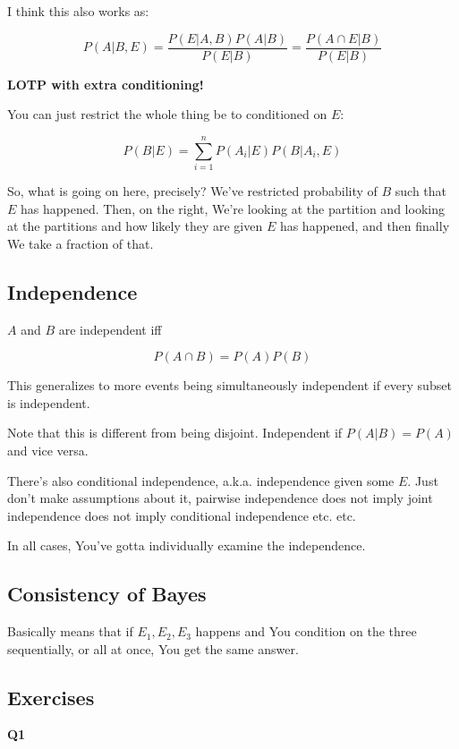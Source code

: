 \documentclass{article}
\begin{document}
			I think this also works as:
				
			$$P(A\vert B, E) = \frac{P(E\vert A, B)P(A\vert B)}{P(E\vert B)} = \frac{P(A\cap E\vert B)}{P(E\vert B)}$$
			
		\textbf{LOTP with extra conditioning!}
		
			You can just restrict the whole thing be to conditioned on $E$:
		
				
			$$P(B\vert E) = \sum^n_{i=1} P(A_i\vert E)P(B\vert A_i, E)$$	
			
			So, what is going on here, precisely? We've restricted probability of $B$ such that $E$ has happened. Then, on the right, We're looking at the partition and looking at the partitions and how likely they are given $E$ has happened, and then finally We take a fraction of that.
	
	\subsection{Independence}
	
		$A$ and $B$ are independent iff
		
		$$P(A \cap B) = P(A)P(B)$$
		
		This generalizes to more events being simultaneously independent if every subset is independent.
		
		Note that this is different from being disjoint. Independent if $P(A\vert B) = P(A)$ and vice versa. 
		
		There's also conditional independence, a.k.a. independence given some $E$. Just don't make assumptions about it, pairwise independence does not imply joint independence does not imply conditional independence etc. etc. 
		
		In all cases, You've gotta individually examine the independence.  
		
	\subsection{Consistency of Bayes}
	
		Basically means that if $E_1, E_2, E_3$ happens and You condition on the three sequentially, or all at once, You get the same answer.
		
	\subsection{Exercises}
	
		\textbf{Q1}
		
\end{document}
